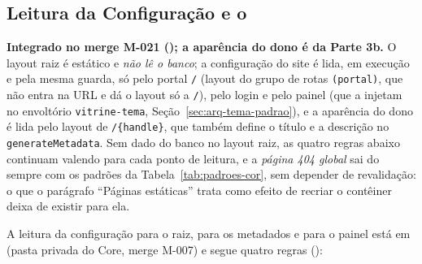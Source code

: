 
\subsection{Leitura da Configuração e o }\label{sec:arq-tema-estatico}

\textbf{Integrado no merge M-021 (); a aparência do dono é da Parte 3b.} O layout raiz é estático e \emph{não lê o banco}; a configuração do site é lida, em execução e pela mesma guarda, só pelo portal \texttt{/} (layout do grupo de rotas \texttt{(portal)}, que não entra na URL e dá o layout só a \texttt{/}), pelo login e pelo painel (que a injetam no envoltório \texttt{vitrine-tema}, Seção~\ref{sec:arq-tema-padrao}), e a aparência do dono é lida pelo layout de \texttt{/\{handle\}}, que também define o título e a descrição no \texttt{generateMetadata}. Sem dado do banco no layout raiz, as quatro regras abaixo continuam valendo para cada ponto de leitura, e a \emph{página 404 global} sai do  sempre com os padrões da Tabela~\ref{tab:padroes-cor}, sem depender de revalidação: o que o parágrafo ``Páginas estáticas'' trata como efeito de recriar o contêiner deixa de existir para ela.

A leitura da configuração para o  raiz, para os metadados e para o painel está em  (pasta privada do Core, merge M-007) e segue quatro regras ():

